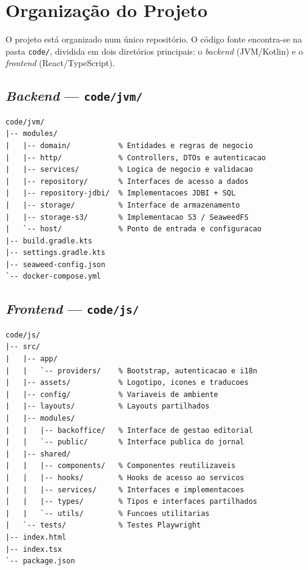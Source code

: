 \documentclass[12pt,a4paper]{article}
\begin{document}
\section{Organização do Projeto}

O projeto está organizado num único repositório. O código fonte encontra-se na pasta \texttt{code/}, dividida em dois diretórios principais: o \textit{backend} (JVM/Kotlin) e o \textit{frontend} (React/TypeScript).
\subsection{\textit{Backend} — \texttt{code/jvm/}}

\begin{lstlisting}
code/jvm/
|-- modules/
|   |-- domain/           % Entidades e regras de negocio
|   |-- http/             % Controllers, DTOs e autenticacao
|   |-- services/         % Logica de negocio e validacao
|   |-- repository/       % Interfaces de acesso a dados
|   |-- repository-jdbi/  % Implementacoes JDBI + SQL
|   |-- storage/          % Interface de armazenamento
|   |-- storage-s3/       % Implementacao S3 / SeaweedFS
|   `-- host/             % Ponto de entrada e configuracao
|-- build.gradle.kts
|-- settings.gradle.kts
|-- seaweed-config.json
`-- docker-compose.yml
\end{lstlisting}

\subsection{\textit{Frontend} — \texttt{code/js/}}

\begin{lstlisting}
code/js/
|-- src/
|   |-- app/
|   |   `-- providers/    % Bootstrap, autenticacao e i18n
|   |-- assets/           % Logotipo, icones e traducoes
|   |-- config/           % Variaveis de ambiente
|   |-- layouts/          % Layouts partilhados
|   |-- modules/
|   |   |-- backoffice/   % Interface de gestao editorial
|   |   `-- public/       % Interface publica do jornal
|   |-- shared/
|   |   |-- components/   % Componentes reutilizaveis
|   |   |-- hooks/        % Hooks de acesso ao servicos
|   |   |-- services/     % Interfaces e implementacoes
|   |   |-- types/        % Tipos e interfaces partilhados
|   |   `-- utils/        % Funcoes utilitarias
|   `-- tests/            % Testes Playwright
|-- index.html
|-- index.tsx
`-- package.json
\end{lstlisting}
\end{document}

